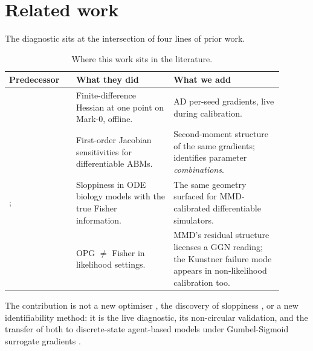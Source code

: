 \section{Related work}
\label{sec:related}

The diagnostic sits at the intersection of four lines of prior work.

\begin{table}[h]
\centering
\caption{Where this work sits in the literature.}
\label{tab:related}
\small
\begin{tabular}{@{}p{0.22\linewidth}p{0.32\linewidth}p{0.36\linewidth}@{}}
\toprule
\textbf{Predecessor} & \textbf{What they did} & \textbf{What we add} \\
\midrule
\citet{naumann_woleske_2024} & Finite-difference Hessian at one point on Mark-0, offline. & AD per-seed gradients, live during calibration. \\
\citet{querabofarull_diffabm_2025} & First-order Jacobian sensitivities for differentiable ABMs. & Second-moment structure of the same gradients; identifies parameter \emph{combinations}. \\
\citet{gutenkunst_sloppy_2007}; \citet{transtrum_geometry_2011} & Sloppiness in ODE biology models with the true Fisher information. & The same geometry surfaced for MMD-calibrated differentiable simulators. \\
\citet{kunstner_opg_2019} & OPG $\neq$ Fisher in likelihood settings. & MMD's residual structure licenses a GGN reading; the Kunstner failure mode appears in non-likelihood calibration too. \\
\bottomrule
\end{tabular}
\end{table}

The contribution is not a new optimiser \citep{schraudolph_sgn_2002,martens_kfac_2015}, the discovery of sloppiness \citep{gutenkunst_sloppy_2007,transtrum_lm_2010}, or a new identifiability method: it is the live diagnostic, its non-circular validation, and the transfer of both to discrete-state agent-based models under Gumbel-Sigmoid surrogate gradients \citep{maddison_concrete_2017,jang_gumbel_2017}.
